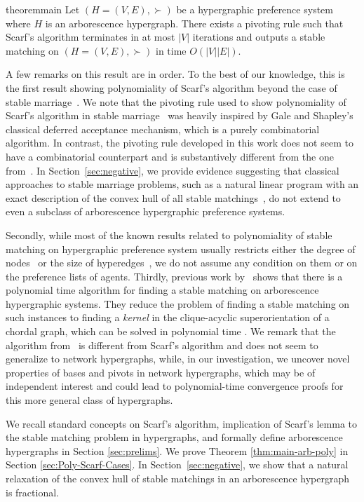 \documentclass[11pt]{article}
\begin{document}
\begin{restatable}{theorem}{main}
\label{thm:main-arb-poly}
Let $(H=(V,E),\succ)$ be a hypergraphic preference system where $H$ is an arborescence hypergraph. There exists a pivoting rule such that Scarf's algorithm terminates in at most $|V|$ iterations and outputs a stable matching on $(H=(V,E),\succ)$ in time $O(|V||E|)$.
\end{restatable}
A few remarks on this result are in order. To the best of our knowledge, this is the first result showing polynomiality of Scarf's algorithm beyond the case of stable marriage~\cite{faenza2023scarf}. We note that the pivoting rule used to show polynomiality of Scarf's algorithm in stable marriage~\cite{faenza2023scarf} was heavily inspired by Gale and Shapley's classical deferred acceptance mechanism, which is a purely combinatorial algorithm. In contrast, the pivoting rule developed in this work does not seem to have a combinatorial counterpart and is substantively different from the one from~\cite{faenza2023scarf}. In Section~\ref{sec:negative}, we provide evidence suggesting that classical approaches to stable marriage problems, such as a natural linear program with an exact description of the convex hull of all stable matchings~\cite{teo1998geometry}, do not extend to even a subclass of arborescence hypergraphic preference systems.

Secondly, while most of the known results related to polynomiality of stable matching on hypergraphic preference system usually restricts either the degree of nodes~\cite{ishizuka2018complexity} or the size of hyperedges~\cite{csaji2022complexity}, we do not assume any condition on them or on the preference lists of agents. Thirdly, previous work by~\cite{csaji2022complexity} shows that there is a polynomial time algorithm for finding a stable matching on arborescence hypergraphic systems. They reduce the problem of finding a stable matching on such instances to finding a \emph{kernel} in the clique-acyclic superorientation of a chordal graph, which can be solved in polynomial time \cite{PIM20}. We remark that the algorithm from~\cite{PIM20} is different from Scarf's algorithm and does not seem to generalize to network hypergraphs, while, in our investigation, we uncover novel properties of bases and pivots in network hypergraphs, which may be of independent interest and could lead to polynomial-time convergence proofs for this more general class of hypergraphs.

We recall standard concepts on Scarf's algorithm, implication of Scarf's lemma to the stable matching problem in hypergraphs, and formally define arborescence hypergraphs in Section \ref{sec:prelims}. We prove Theorem \ref{thm:main-arb-poly} in Section \ref{sec:Poly-Scarf-Cases}. In Section~\ref{sec:negative}, we show that a natural relaxation of the convex hull of stable matchings in an arborescence hypergraph is fractional.  
\end{document}
